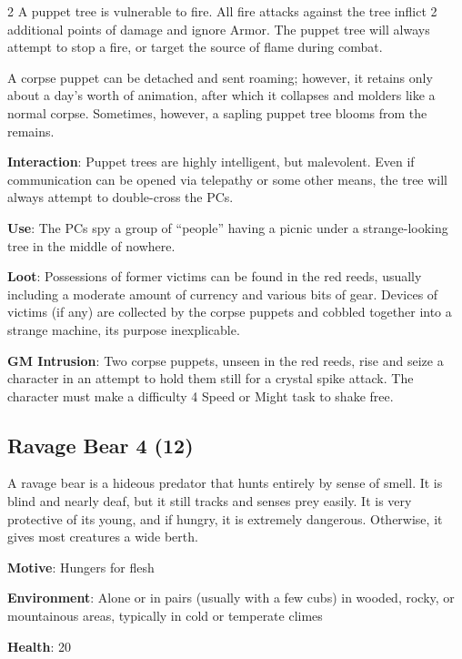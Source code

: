 \begin{multicols}{2}
A puppet tree is vulnerable to fire. All fire attacks against the tree inflict 2 additional points of damage and ignore Armor. The puppet tree will always attempt to stop a fire, or target the source of flame during combat.

A corpse puppet can be detached and sent roaming; however, it retains only about a day’s worth of animation, after which it collapses and molders like a normal corpse. Sometimes, however, a sapling puppet tree blooms from the remains.

\textbf{Interaction}: Puppet trees are highly intelligent, but malevolent. Even if communication can be opened via telepathy or some other means, the tree will always attempt to double-cross the PCs.

\textbf{Use}: The PCs spy a group of “people” having a picnic under a strange-looking tree in the middle of nowhere.

\textbf{Loot}: Possessions of former victims can be found in the red reeds, usually including a moderate amount of currency and various bits of gear. Devices of victims (if any) are collected by the corpse puppets and cobbled together into a strange machine, its purpose inexplicable.

\textbf{GM Intrusion}: Two corpse puppets, unseen in the red reeds, rise and seize a character in an attempt to hold them still for a crystal spike attack. The character must make a difficulty 4 Speed or Might task to shake free.

\subsection{Ravage Bear	4 (12)}

A ravage bear is a hideous predator that hunts entirely by sense of smell. It is blind and nearly deaf, but it still tracks and senses prey easily. It is very protective of its young, and if hungry, it is extremely dangerous. Otherwise, it gives most creatures a wide berth.

\textbf{Motive}: Hungers for flesh

\textbf{Environment}: Alone or in pairs (usually with a few cubs) in wooded, rocky, or mountainous areas, typically in cold or temperate climes

\textbf{Health}: 20


\end{multicols}
